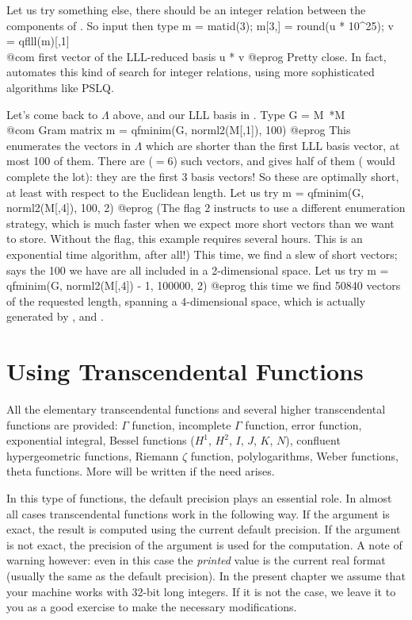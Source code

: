 Let us try something else, there should be an integer relation between the
components of . So input  then type
\bprog
  m = matid(3); m[3,] = round(u * 10^25);
  v = qflll(m)[,1] \\@com first vector of the LLL-reduced basis
  u * v
@eprog\noindent
Pretty close. In fact,  automates this kind of search for integer
relations, using more sophisticated algorithms like PSLQ.

Let's come back to $\Lambda$ above, and our LLL basis in . Type 
\bprog
  G = M~*M  \\@com Gram matrix
  m = qfminim(G, norml2(M[,1]), 100)
@eprog\noindent
This enumerates the vectors in $\Lambda$ which are shorter than the first LLL
basis vector, at most 100 of them. There are  ($= 6$) such vectors,
and  gives half of them ( would complete the lot): they
are the first 3 basis vectors! So these are optimally short, at least with
respect to the Euclidean length. Let us try 
\bprog
  m = qfminim(G, norml2(M[,4]), 100, 2)
@eprog\noindent
(The flag $2$ instructs  to use a different enumeration
strategy, which is much faster when we expect more short vectors than we want
to store. Without the flag, this example requires several hours. This is an
exponential time algorithm, after all!) This time, we find a slew of short
vectors;  says the 100 we have are all included in a
2-dimensional space. Let us try
\bprog
  m = qfminim(G, norml2(M[,4]) - 1, 100000, 2)
@eprog\noindent
this time we find 50840 vectors of the requested length, spanning a
$4$-dimensional space, which is actually generated by ,
  and .

\section{Using Transcendental Functions}

All the elementary transcendental functions and several higher transcendental
functions are provided: $\Gamma$ function, incomplete $\Gamma$ function, error
function, exponential integral, Bessel functions ($H^1$, $H^2$, $I$, $J$,
$K$, $N$), confluent hypergeometric functions, Riemann $\zeta$ function,
polylogarithms, Weber functions, theta functions. More will be written if the
need arises.

In this type of functions, the default precision plays an essential role.
In almost all cases transcendental functions work in the following way.
If the argument is exact, the result is computed using the current
default precision. If the argument is not exact, the precision of the
argument is used for the computation. A note of warning however: even in this
case the \emph{printed} value is the current real format (usually the
same as the default precision). In the present chapter we assume that your
machine works with 32-bit long integers. If it is not the case, we leave it
to you as a good exercise to make the necessary modifications.

